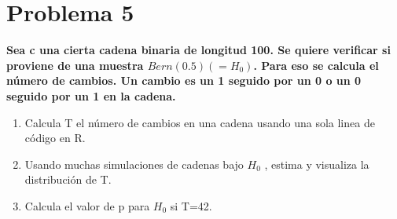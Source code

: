 \section*{Problema 5}

\textbf{Sea c una cierta cadena binaria de longitud 100. Se quiere verificar si proviene de una muestra $Bern(0.5)(=H_0)$. Para eso se calcula el número de cambios. Un cambio es un 1 seguido por un 0 o un 0 seguido por un 1 en la cadena.}

\begin{enumerate}
	\item  Calcula T el número de cambios en una cadena usando una sola linea de código en R.
	\item Usando muchas simulaciones de cadenas bajo $H_0$ , estima y visualiza la distribución de T.
	\item Calcula el valor de p para $H_0$ si T=42.
\end{enumerate}
